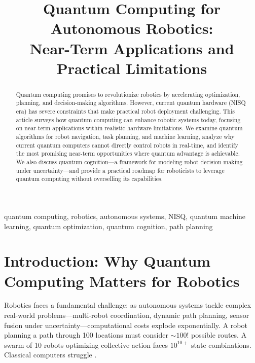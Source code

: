 \documentclass[conference]{IEEEtran}
\begin{document}
\title{Quantum Computing for Autonomous Robotics:\\Near-Term Applications and Practical Limitations}

\author{
}

\maketitle

\begin{abstract}
Quantum computing promises to revolutionize robotics by accelerating optimization, planning, and decision-making algorithms. However, current quantum hardware (NISQ era) has severe constraints that make practical robot deployment challenging. This article surveys how quantum computing can enhance robotic systems today, focusing on near-term applications within realistic hardware limitations. We examine quantum algorithms for robot navigation, task planning, and machine learning, analyze why current quantum computers cannot directly control robots in real-time, and identify the most promising near-term opportunities where quantum advantage is achievable. We also discuss quantum cognition---a framework for modeling robot decision-making under uncertainty---and provide a practical roadmap for roboticists to leverage quantum computing without overselling its capabilities.
\end{abstract}

\begin{IEEEkeywords}
quantum computing, robotics, autonomous systems, NISQ, quantum machine learning, quantum optimization, quantum cognition, path planning
\end{IEEEkeywords}

\section{Introduction: Why Quantum Computing Matters for Robotics}

Robotics faces a fundamental challenge: as autonomous systems tackle complex real-world problems---multi-robot coordination, dynamic path planning, sensor fusion under uncertainty---computational costs explode exponentially. A robot planning a path through 100 locations must consider $\sim100!$ possible routes. A swarm of 10 robots optimizing collective action faces $10^{10+}$ state combinations. Classical computers struggle \cite{b1, b2, b3}.
\end{document}
